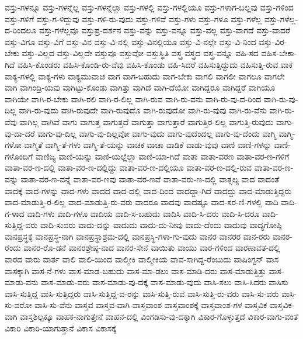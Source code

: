 {ವಸ್ತು-ಗಳನ್ನೂ
ವಸ್ತು-ಗಳನ್ನೆಲ್ಲ
ವಸ್ತು-ಗಳನ್ನೆಲ್ಲಾ
ವಸ್ತು-ಗಳಲ್ಲಿ
ವಸ್ತು-ಗಳಲ್ಲಿಯೂ
ವಸ್ತು-ಗಳಾಗ-ಬಲ್ಲವು
ವಸ್ತು-ಗಳಿಂದ
ವಸ್ತು-ಗಳಿಗೆ
ವಸ್ತು-ಗ-ಳಿದ್ದುವು
ವಸ್ತು-ಗಳಿ-ರು-ವುದು
ವಸ್ತು-ಗಳಿವೆ
ವಸ್ತು-ಗಳು
ವಸ್ತು-ಗಳೂ
ವಸ್ತು-ಗಳೆಲ್ಲ
ವಸ್ತು-ಗಳೆಲ್ಲ-ದ-ರಿಂದಲೂ
ವಸ್ತು-ಗಳೆಲ್ಲವೂ
ವಸ್ತುಪ್ರ-ದರ್ಶನ
ವಸ್ತು-ವನ್ನು
ವಸ್ತು-ವನ್ನೂ
ವಸ್ತು-ವಲ್ಲ
ವಸ್ತು-ವಾಗದೆ
ವಸ್ತು-ವಾದರೆ
ವಸ್ತು-ವಿಗೂ
ವಸ್ತು-ವಿಗೆ
ವಸ್ತು-ವಿನ
ವಸ್ತು-ವಿ-ನಲ್ಲಿ
ವಸ್ತು-ವಿನಲ್ಲಿಯೂ
ವಸ್ತು-ವಿ-ನಲ್ಲೇ
ವಸ್ತು-ವಿ-ನಿಂದ
ವಸ್ತು-ವಿರ-ಬೇಕು
ವಸ್ತು-ವಿಲ್ಲದ
ವಸ್ತು-ವಿಲ್ಲದೇ
ವಸ್ತುವೂ
ವಸ್ತುವೋ
ವಸ್ತುಸ್ಥಿತಿ
ವಸ್ತ್ರ
ವಸ್ತ್ರದ
ವಸ್ತ್ರ-ವನ್ನೂ
ವಹಿ-ಸದ
ವಹಿಸ-ಬೇಕಾ-ಗಿದೆ
ವಹಿಸಿ-ಕೊಂಡರು
ವಹಿಸಿ-ಕೊಂಡಿ-ರು-ವೆವು
ವಹಿಸಿ-ಕೊಂಡು
ವಹಿ-ಸಿದರೆ
ವಹಿಸುತ್ತಿದ್ದುದು
ವಹಿಸುತ್ತಿ-ರುವ
ವಾಕ
ವಾಕ್ಯ-ಗಳಲ್ಲಿ
ವಾಕ್ಯ-ಗಳು
ವಾಕ್ಯಮುವಾಚ
ವಾಗ
ವಾಗ-ಬಹುದು
ವಾಗ-ಬೇಕು
ವಾಗಲಿ
ವಾಗಲೀ
ವಾಗಲೂ
ವಾಗಲೇ
ವಾಗಿ
ವಾಗಿಂದ್ರಿ-ಯವು
ವಾಗಿಟ್ಟು-ಕೊಂಡು
ವಾಗಿತ್ತು
ವಾಗಿದೆ
ವಾಗಿ-ದೆಯೋ
ವಾಗಿದ್ದರೂ
ವಾಗಿದ್ದರೆ
ವಾಗಿಯೂ
ವಾಗಿಯೇ
ವಾಗಿ-ರ-ಬೇಕು
ವಾಗಿ-ರಲಿ
ವಾಗಿ-ರ-ಲಿಲ್ಲ
ವಾಗಿ-ರುವ
ವಾಗಿ-ರು-ವನು
ವಾಗಿ-ರು-ವು-ದ-ರಿಂದ
ವಾಗಿ-ರು-ವು-ದಿಲ್ಲ
ವಾಗಿ-ರು-ವುದು
ವಾಗಿ-ರುವುದೇ
ವಾಗಿ-ರುವುದೊ
ವಾಗಿ-ರುವುದೋ
ವಾಗಿ-ರು-ವುವು
ವಾಗಿ-ರು-ವೆನು
ವಾಗಿ-ರು-ವೆವು
ವಾಗಿಲ್ಲ
ವಾಗಿವೆ
ವಾಗು
ವಾಗುತ್ತ
ವಾಗುತ್ತದೆ
ವಾಗುತ್ತಾ
ವಾಗುತ್ತಾರೆ
ವಾಗುತ್ತಿರ-ಲಿಲ್ಲ
ವಾಗುತ್ತಿ-ರುವುದು
ವಾಗು-ವು-ದಾ-ದರೆ
ವಾಗು-ವು-ದಿಲ್ಲ
ವಾಗು-ವು-ದಿಲ್ಲವೋ
ವಾಗು-ವುದು
ವಾಗು-ವುದೆಂದಲ್ಲ
ವಾಗು-ವು-ದೆಂದು
ವಾಗ್ಮಿ
ವಾಗ್ಮಿ-ಗಳೋ
ವಾಗ್ಮಿತೆ
ವಾಗ್ಮಿ-ತೆ-ಗಳು
ವಾಗ್ಮಿ-ತೆ-ಯನ್ನು
ವಾಚಕ
ವಾಚಾ
ವಾಡಿಕೆ
ವಾಡು-ವುವು
ವಾಣಿ
ವಾಣಿ-ಗಳನ್ನು
ವಾಣಿ-ಗಳೊಂದಿಗೆ
ವಾಣಿಜ್ಯ
ವಾಣಿ-ಯನ್ನು
ವಾಣಿ-ಯಲ್ಲೆಲ್ಲಾ
ವಾಣಿ-ಯಾ-ಗಿದೆ
ವಾತಾ
ವಾತಾ-ವರಣ
ವಾತಾ-ವರ-ಣ-ಗಳಿಗೆ
ವಾತಾ-ವರ-ಣ-ದಲ್ಲಿ
ವಾತಾ-ವರ-ಣ-ದಲ್ಲಿದ್ದು
ವಾತಾ-ವರ-ಣ-ದಲ್ಲಿಯೂ
ವಾತಾ-ವರ-ಣ-ದಲ್ಲಿ-ರುವ
ವಾತಾ-ವರ-ಣ-ವನ್ನು
ವಾತಾ-ವರ-ಣ-ವನ್ನೆ
ವಾತಾ-ವರ-ಣವು
ವಾತಾ-ವರ-ಣವೆ
ವಾತಾ-ವರು-ಣ-ದಲ್ಲಿ
ವಾತ್ಸಲ್ಯ
ವಾದ
ವಾದಂತೆ
ವಾದಕ್ಕೆ
ವಾದ-ಗಳನ್ನು
ವಾದ-ಗಳು
ವಾದದ
ವಾದ-ದಲ್ಲಿ
ವಾದ-ದಿಂದ
ವಾದದ್ದಾ-ಗಿದೆ
ವಾದದ್ದು
ವಾದ-ಮಾಡುತ್ತಿದ್ದರು
ವಾದ-ಮಾಡುತ್ತಿ-ರ-ಲಿಲ್ಲ
ವಾದ-ಮಾಡುತ್ತಿ-ರು-ವರು
ವಾದರೂ
ವಾದವು
ವಾದಷ್ಟೂ
ವಾದ-ಸರ-ಣಿ-ಗಳಲ್ಲಿ
ವಾದಿ
ವಾದಿ-ಗ-ಳಾದ
ವಾದಿ-ಗಳು
ವಾದಿ-ಗಳೂ
ವಾದಿಯ
ವಾದಿ-ಸ-ಬಹುದು
ವಾದಿಸಿ
ವಾದಿ-ಸಿ-ದರು
ವಾದಿ-ಸಿ-ದರೂ
ವಾದಿ-ಸುತ್ತಿದ್ದ-ವರು
ವಾದಿ-ಸುವರು
ವಾದು-ದನ್ನು
ವಾದುದು
ವಾದು-ದು-ನೀವು
ವಾದು-ದೆಂದು
ವಾದುವು
ವಾದ್ಯಗೋಷ್ಠಿ
ವಾನಪ್ರಸ್ಥಕ್ಕೆ
ವಾನಪ್ರಸ್ಥ-ನಾಗಿ
ವಾನಪ್ರಸ್ಥಾಶ್ರಮ-ದಲ್ಲಿ
ವಾನಪ್ರಸ್ಥಿ-ಗಳಾ-ಗು-ವುದು
ವಾನರ
ವಾನರರ
ವಾನ-ರರು
ವಾನರ-ರೆಂದು
ವಾನರ-ರೊ-ಡನೆ
ವಾನರಶ್ರೇಷ್ಠ-ನಾದ
ವಾನರ-ಸೇನೆ
ವಾಯಿತು
ವಾಯು
ವಾರ-ಗಳಿಂದ
ವಾರಣಾವತ-ದಲ್ಲಿ
ವಾರದ
ವಾರು
ವಾರ್ತ
ವಾಲಿ
ವಾಲಿ-ಯಿಂದ
ವಾಲ್ಮೀಕಿ
ವಾಲ್ಮೀಕಿಯ
ವಾವ-ಸಾಗಿದ್ದ-ರೆಂಬುದು
ವಾಷಿಂಗ್ಟನ್
ವಾಸ
ವಾಸಕ್ಕಾಗಿ
ವಾಸ-ನೆ-ಗಳು
ವಾಸ-ಮಾಡ-ಬಹುದು
ವಾಸ-ಮಾ-ಡಲು
ವಾಸ-ಮಾಡಿ-ದರು
ವಾಸ-ಮಾಡುತ್ತಿತ್ತು
ವಾಸ-ಮಾಡು-ವನು
ವಾಸ-ಮಾಡು-ವರು
ವಾಸ-ಮಾಡು-ವು-ದಕ್ಕೆ
ವಾಸ-ಮಾಡು-ವುದು
ವಾಸಿ-ಸಲು
ವಾಸಿ-ಸಿದರು
ವಾಸಿಸು
ವಾಸಿ-ಸುತ್ತಿದ್ದ
ವಾಸಿ-ಸುತ್ತಿದ್ದರು
ವಾಸಿ-ಸುತ್ತಿದ್ದ-ವ-ರನ್ನು
ವಾಸಿ-ಸುತ್ತಿ-ರುವ
ವಾಸಿ-ಸುತ್ತಿ-ರು-ವರು
ವಾಸಿ-ಸು-ವರು
ವಾಸಿ-ಸು-ವರೋ
ವಾಸಿ-ಸು-ವೆನು
ವಾಸ್ತವ
ವಾಸ್ತವ-ವಾಗಿ
ವಾಸ್ತವಾಂಶ
ವಾಸ್ತವಾಂಶಕ್ಕೆ
ವಾಸ್ತವಾಂಶ-ಗಳ
ವಾಸ್ತವಿಕ
ವಾಸ್ತವಿಕ-ವಾಗಿ
ವಾಸ್ತಶಿಲ್ಪಕ್ಕೂ
ವಾಹಕ-ನಾಗುತ್ತೇನೆ
ವಾಹನ-ದಲ್ಲಿ
ವಿಂಗಡಿಸು-ವು-ದಕ್ಕಾಗಿ
ವಿಕಾರ-ಗೊಳ್ಳುತ್ತದೆ
ವಿಕಾರ-ವಾಗು-ವಂತೆ
ವಿಕಾರಿ
ವಿಕಾರಿ-ಯಾಗುತ್ತಾನೆ
ವಿಕಾಸ
ವಿಕಾಸಕ್ಕೆ
}
